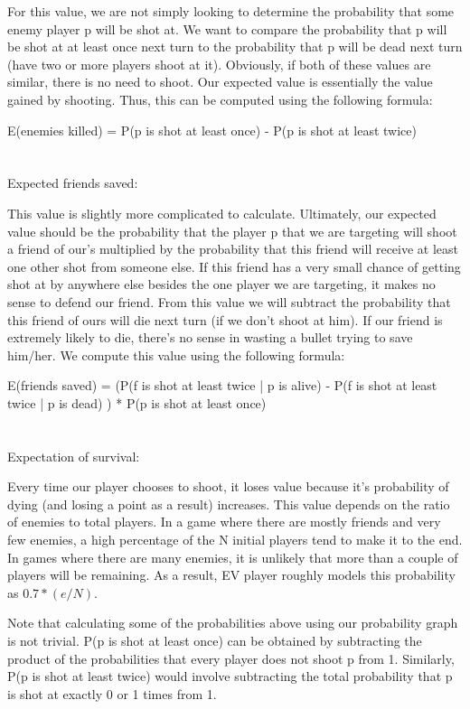 \documentclass[
10pt, %
letterpaper, %
oneside, %
headinclude,footinclude, %
english
]{article}
\begin{document}
For this value, we are not simply looking to determine the probability that some enemy player p will be shot at. We want to compare the probability that p will be shot at at least once next turn to the probability that p will be dead next turn (have two or more players shoot at it). Obviously, if both of these values are similar, there is no need to shoot. Our expected value is essentially the value gained by shooting. Thus, this can be computed using the following formula: 

E(enemies killed) = P(p is shot at least once) - P(p is shot at least twice) 
\\
\\
\\
Expected friends saved:

This value is slightly more complicated to calculate. Ultimately, our expected value should be the probability that the player p that we are targeting will shoot a friend of our’s multiplied by the probability that this friend will receive at least one other shot from someone else. If this friend has a very small chance of getting shot at by anywhere else besides the one player we are targeting, it makes no sense to defend our friend. From this value we will subtract the probability that this friend of ours will die next turn (if we don’t shoot at him). If our friend is extremely likely to die, there’s no sense in wasting a bullet trying to save him/her. We compute this value using the following formula:

E(friends saved) = (P(f is shot at least twice | p is alive) - P(f is shot at least twice | p is dead) ) * P(p is shot at least once)
\\
\\
\\

Expectation of survival:

Every time our player chooses to shoot, it loses value because it’s probability of dying (and losing a point as a result) increases. This value depends on the ratio of enemies to total players. In a game where there are mostly friends and very few enemies, a high percentage of the N initial players tend to make it to the end. In games where there are many enemies, it is unlikely that more than a couple of players will be remaining. As a result, EV player roughly models this probability as $0.7 * (e/N)$.

Note that calculating some of the probabilities above using our probability graph is not trivial. P(p is shot at least once) can be obtained by subtracting the product of the probabilities that every player does not shoot p from 1. Similarly, P(p is shot at least twice) would involve subtracting the total probability that p is shot at exactly 0 or 1 times from 1. 
\end{document}
